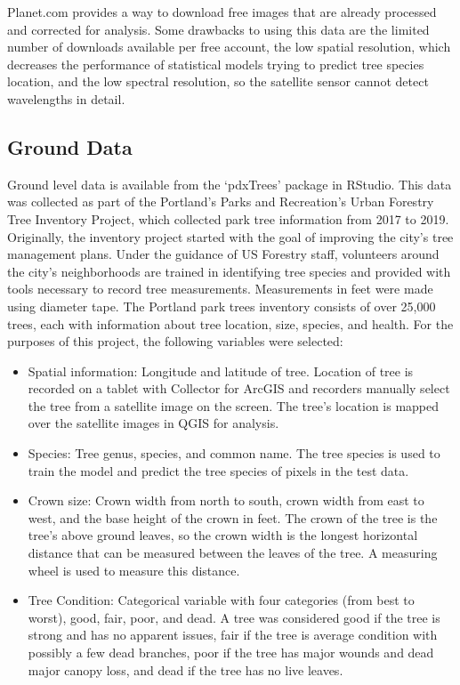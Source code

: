 \documentclass[12pt,twoside]{reedthesis}
\begin{document}
Planet.com provides a way to download free images that are already processed and corrected for analysis. Some drawbacks to using this data are the limited number of downloads available per free account, the low spatial resolution, which decreases the performance of statistical models trying to predict tree species location, and the low spectral resolution, so the satellite sensor cannot detect wavelengths in detail.

\hypertarget{ground-data}{%
\subsection{Ground Data}\label{ground-data}}

Ground level data is available from the `pdxTrees' package in RStudio. This data was collected as part of the Portland's Parks and Recreation's Urban Forestry Tree Inventory Project, which collected park tree information from 2017 to 2019. Originally, the inventory project started with the goal of improving the city's tree management plans. Under the guidance of US Forestry staff, volunteers around the city's neighborhoods are trained in identifying tree species and provided with tools necessary to record tree measurements. Measurements in feet were made using diameter tape. The Portland park trees inventory consists of over 25,000 trees, each with information about tree location, size, species, and health. For the purposes of this project, the following variables were selected:
\begin{itemize}
\item
  Spatial information: Longitude and latitude of tree. Location of tree is recorded on a tablet with Collector for ArcGIS and recorders manually select the tree from a satellite image on the screen. The tree's location is mapped over the satellite images in QGIS for analysis.
\item
  Species: Tree genus, species, and common name. The tree species is used to train the model and predict the tree species of pixels in the test data.
\item
  Crown size: Crown width from north to south, crown width from east to west, and the base height of the crown in feet. The crown of the tree is the tree's above ground leaves, so the crown width is the longest horizontal distance that can be measured between the leaves of the tree. A measuring wheel is used to measure this distance.
\item
  Tree Condition: Categorical variable with four categories (from best to worst), good, fair, poor, and dead. A tree was considered good if the tree is strong and has no apparent issues, fair if the tree is average condition with possibly a few dead branches, poor if the tree has major wounds and dead major canopy loss, and dead if the tree has no live leaves.
\end{itemize}
\end{document}
